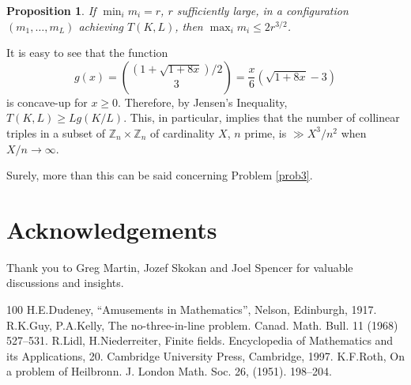 \documentclass[12pt]{article}
\newtheorem{prop}[theorem]{Proposition}
\newcommand{\Z}{{\mathbb Z}}
\begin{document}
\begin{prop} If $\min_i m_i = r$, $r$ sufficiently large, in a configuration $(m_1,\ldots,m_L)$ achieving $T(K,L)$, then $\max_i m_i \leq 2 r^{3/2}$.
\end{prop}

It is easy to see that the function
$$
g(x) = \binom{(1+\sqrt{1+8x})/2}{3} = \frac{x}{6} \left (\sqrt{1+8x}-3 \right)
$$
is concave-up for $x \geq 0$.  Therefore, by Jensen's Inequality, $T(K,L) \geq L g(K/L)$.  This, in particular, implies that the number of collinear triples in a subset of $\Z_n \times \Z_n$ of cardinality $X$, $n$ prime, is $\gg X^3/n^2$ when $X/n \rightarrow \infty$.

Surely, more than this can be said concerning Problem \ref{prob3}.

\section{Acknowledgements}

Thank you to Greg Martin, Jozef Skokan and Joel Spencer for
valuable discussions and insights.

\begin{thebibliography}{100}
 H.\@ E.\@ Dudeney, ``Amusements in Mathematics'', Nelson, Edinburgh, 1917.
 R.\@ K.\@ Guy, P.\@ A.\@ Kelly, The no-three-in-line problem.  Canad. Math. Bull. 11 (1968) 527--531.
 R.\@ Lidl, H.\@ Niederreiter, Finite fields. Encyclopedia of Mathematics and its Applications, 20. Cambridge University Press, Cambridge, 1997.
 K.\@ F.\@ Roth, On a problem of Heilbronn. J. London Math. Soc. 26, (1951). 198--204.
\end{thebibliography}
\end{document}
